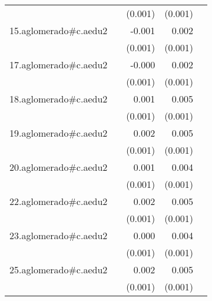 {\begin{longtable}{l*{4}{D{.}{.}{-1}}}
            &                     &     (0.001)         &     (0.001)         &                     \\
\addlinespace
15.aglomerado#c.aedu2&                     &      -0.001         &       0.002\sym{**} &                     \\
            &                     &     (0.001)         &     (0.001)         &                     \\
\addlinespace
17.aglomerado#c.aedu2&                     &      -0.000         &       0.002\sym{*}  &                     \\
            &                     &     (0.001)         &     (0.001)         &                     \\
\addlinespace
18.aglomerado#c.aedu2&                     &       0.001         &       0.005\sym{***}&                     \\
            &                     &     (0.001)         &     (0.001)         &                     \\
\addlinespace
19.aglomerado#c.aedu2&                     &       0.002         &       0.005\sym{***}&                     \\
            &                     &     (0.001)         &     (0.001)         &                     \\
\addlinespace
20.aglomerado#c.aedu2&                     &       0.001         &       0.004\sym{***}&                     \\
            &                     &     (0.001)         &     (0.001)         &                     \\
\addlinespace
22.aglomerado#c.aedu2&                     &       0.002         &       0.005\sym{***}&                     \\
            &                     &     (0.001)         &     (0.001)         &                     \\
\addlinespace
23.aglomerado#c.aedu2&                     &       0.000         &       0.004\sym{***}&                     \\
            &                     &     (0.001)         &     (0.001)         &                     \\
\addlinespace
25.aglomerado#c.aedu2&                     &       0.002         &       0.005\sym{***}&                     \\
            &                     &     (0.001)         &     (0.001)         &                     \\

\end{longtable}}
